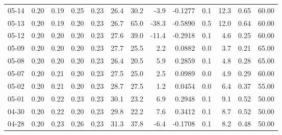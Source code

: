 \begin{threeparttable}
{\begin{tabular}{lrrrrrrrrrrrr}
  05-14 &          0.20 &          0.19 &          0.25 &        0.23 &                26.4 &                30.2 &       -3.9 &      -0.1277 &                 0.1 &             12.3 &            0.65 &                  60.00 \\
  05-13 &          0.20 &          0.19 &          0.20 &        0.23 &                26.7 &                65.0 &      -38.3 &      -0.5890 &                 0.5 &             12.0 &            0.64 &                  60.00 \\
  05-12 &          0.20 &          0.20 &          0.20 &        0.23 &                27.6 &                39.0 &      -11.4 &      -0.2918 &                 0.1 &              4.6 &            0.25 &                  60.00 \\
  05-09 &          0.20 &          0.20 &          0.20 &        0.23 &                27.7 &                25.5 &        2.2 &       0.0882 &                 0.0 &              3.7 &            0.21 &                  65.00 \\
  05-08 &          0.20 &          0.20 &          0.20 &        0.23 &                26.4 &                20.5 &        5.9 &       0.2859 &                 0.1 &              4.8 &            0.28 &                  65.00 \\
  05-07 &          0.20 &          0.21 &          0.20 &        0.23 &                27.5 &                25.0 &        2.5 &       0.0989 &                 0.0 &              4.9 &            0.29 &                  60.00 \\
  05-02 &          0.20 &          0.21 &          0.20 &        0.23 &                28.7 &                27.5 &        1.2 &       0.0454 &                 0.0 &              6.4 &            0.37 &                  55.00 \\
  05-01 &          0.20 &          0.22 &          0.23 &        0.23 &                30.1 &                23.2 &        6.9 &       0.2948 &                 0.1 &              9.1 &            0.52 &                  50.00 \\
  04-30 &          0.20 &          0.22 &          0.20 &        0.23 &                29.8 &                22.2 &        7.6 &       0.3412 &                 0.1 &              8.7 &            0.52 &                  50.00 \\
  04-28 &          0.20 &          0.23 &          0.26 &        0.23 &                31.3 &                37.8 &       -6.4 &      -0.1708 &                 0.1 &              8.2 &            0.48 &                  50.00 \\

\end{tabular}}
\end{threeparttable}
